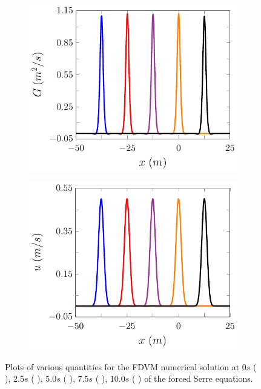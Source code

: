 \begin{figure}
\begin{subfigure}{0.5\textwidth}
		\vspace{0.5cm}
	\end{subfigure}
	\begin{subfigure}{0.5\textwidth}
		\includegraphics[width=\textwidth]{./chp5/figures/Forced/Wet/FDVMExG.pdf}
		\vspace{0.5cm}
	\end{subfigure}%
	\begin{subfigure}{0.5\textwidth}
		\includegraphics[width=\textwidth]{./chp5/figures/Forced/Wet/FDVMExu.pdf}
		\vspace{0.5cm}
	\end{subfigure}
	\caption{Plots of various quantities for the FDVM numerical solution at $0s$ ({\color{blue} \solidrule}), $2.5s$ ({\color{red} \solidrule}), $5.0s$ ({\color{violet!80!white} \solidrule}), $7.5s$ ({\color{orange} \solidrule}), $10.0s$ ({\color{black} \solidrule}) of the forced Serre equations.}
	\label{fig:ForcedWetFDVMP2PExAll}
\end{figure}


